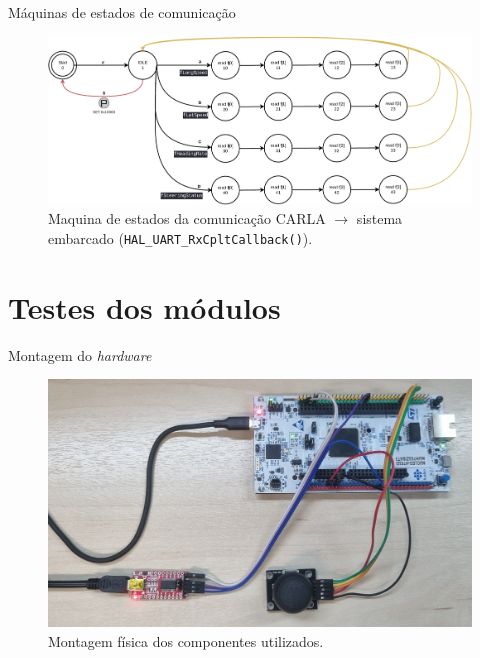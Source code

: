 \documentclass{if-beamer}
\begin{document}
\begin{frame}{Máquinas de estados de comunicação}
	
	\begin{figure}[H]
		\centering
		\includegraphics[width=\linewidth]{sm_carla_2_uc}
		\caption{Maquina de estados da comunicação CARLA $\longrightarrow$ sistema embarcado (\texttt{HAL\_UART\_RxCpltCallback()}).}
		\label{fig:sm_carla_2_uc}
	\end{figure}

\end{frame}


\section{Testes dos módulos}

\begin{frame}{Montagem do \textit{hardware}}
	
	\begin{figure}[H]
		\centering
		\includegraphics[width=0.8\linewidth]{montagem}
		\caption{Montagem física dos componentes utilizados.}
		\label{fig:somevideo}
	\end{figure}
	
	
	
\end{frame}
\end{document}
